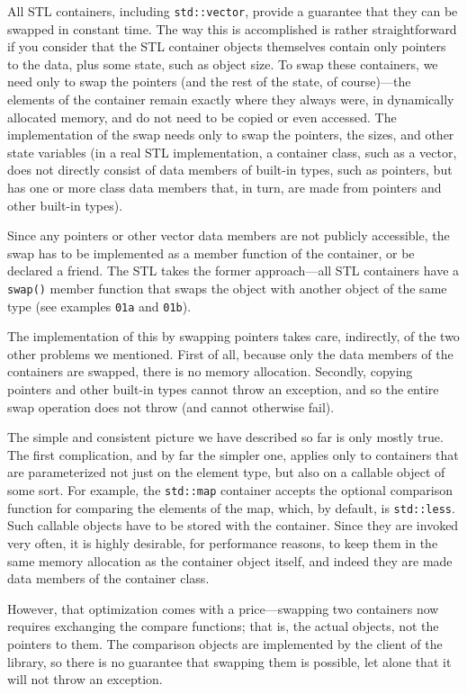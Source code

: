 All STL containers, including \texttt{std::vector}, provide a guarantee that they can be swapped in constant time. The way this is accomplished is rather straightforward if you consider that the STL container objects themselves contain only pointers to the data, plus some state, such as object size. To swap these containers, we need only to swap the pointers (and the rest of the state, of course)---the elements of the container remain exactly where they always were, in dynamically allocated memory, and do not need to be copied or even accessed. The implementation of the swap needs only to swap the pointers, the sizes, and other state variables (in a real STL implementation, a container class, such as a vector, does not directly consist of data members of built-in types, such as pointers, but has one or more class data members that, in turn, are made from pointers and other built-in types).

Since any pointers or other vector data members are not publicly accessible, the swap has to be implemented as a member function of the container, or be declared a friend. The STL takes the former approach---all STL containers have a \texttt{swap()} member function that swaps the object with another object of the same type (see examples \texttt{01a} and \texttt{01b}).

The implementation of this by swapping pointers takes care, indirectly, of the two other problems we mentioned. First of all, because only the data members of the containers are swapped, there is no memory allocation. Secondly, copying pointers and other built-in types cannot throw an exception, and so the entire swap operation does not throw (and cannot otherwise fail).

The simple and consistent picture we have described so far is only mostly true. The first complication, and by far the simpler one, applies only to containers that are parameterized not just on the element type, but also on a callable object of some sort. For example, the \texttt{std::map} container accepts the optional comparison function for comparing the elements of the map, which, by default, is \texttt{std::less}. Such callable objects have to be stored with the container. Since they are invoked very often, it is highly desirable, for performance reasons, to keep them in the same memory allocation as the container object itself, and indeed they are made data members of the container class.

However, that optimization comes with a price---swapping two containers now requires exchanging the compare functions; that is, the actual objects, not the pointers to them. The comparison objects are implemented by the client of the library, so there is no guarantee that swapping them is possible, let alone that it will not throw an exception.

